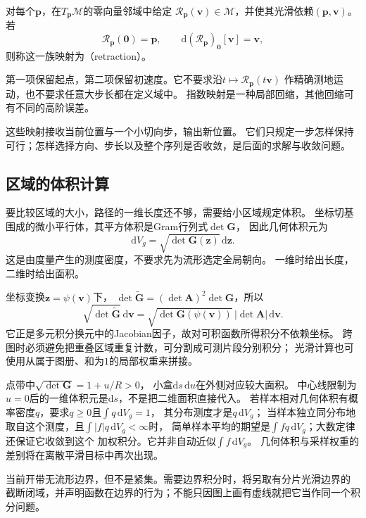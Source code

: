 \begin{definition}[回缩]
\label{def:geometry-retraction}
对每个$\bm p$，在$T_{\bm p}\mathcal M$的零向量邻域中给定
$\mathcal R_{\bm p}(\bm v)\in\mathcal M$，并使其光滑依赖$(\bm p,\bm v)$。
若
\[
 \mathcal R_{\bm p}(\bm0)=\bm p,\qquad
 \mathrm d(\mathcal R_{\bm p})_{\bm0}[\bm v]=\bm v,
\]
则称这一族映射为（retraction）。
\end{definition}
第一项保留起点，第二项保留初速度。它不要求沿$t\mapsto\mathcal R_{\bm p}(t\bm v)$
作精确测地运动，也不要求任意大步长都在定义域中。
指数映射是一种局部回缩，其他回缩可有不同的高阶误差。


这些映射接收当前位置与一个小切向步，输出新位置。
它们只规定一步怎样保持可行；怎样选择方向、步长以及整个序列是否收敛，是后面的求解与收敛问题。

\subsection{区域的体积计算}
\label{sec:geometry-riemannian-volume}

要比较区域的大小，路径的一维长度还不够，需要给小区域规定体积。
坐标切基围成的微小平行体，其平方体积是Gram行列式$\det\bm G$，
因此几何体积元为
\begin{equation}
 \mathrm dV_g=\sqrt{\det\bm G(\bm z)}\,\mathrm d\bm z.
 \label{eq:geometry-riemannian-volume}
\end{equation}
这是由度量产生的测度密度，不要求先为流形选定全局朝向。
一维时给出长度，二维时给出面积。

坐标变换$\bm z=\psi(\bm v)$下，
$\det\widetilde{\bm G}=(\det\bm A)^2\det\bm G$，所以
\[
 \sqrt{\det\widetilde{\bm G}}\,\mathrm d\bm v
 =\sqrt{\det\bm G(\psi(\bm v))}\,|\det\bm A|\,\mathrm d\bm v.
\]
它正是多元积分换元中的Jacobian因子，故对可积函数所得积分不依赖坐标。
跨图时必须避免把重叠区域重复计数，可分割成可测片段分别积分；
光滑计算也可使用从属于图册、和为$1$的局部权重来拼接。

点带中$\sqrt{\det\bm G}=1+u/R>0$，
小盒$\mathrm ds\,\mathrm du$在外侧对应较大面积。
中心线限制为$u=0$后的一维体积元是$\mathrm ds$，不是把二维面积直接代入。
若样本相对几何体积有概率密度$q$，要求$q\geq0$且$\int q\,\mathrm dV_g=1$，
其分布测度才是$q\,\mathrm dV_g$；
当样本独立同分布地取自这个测度，且$\int|f|q\,\mathrm dV_g<\infty$时，
简单样本平均的期望是$\int fq\,\mathrm dV_g$；大数定律还保证它收敛到这个
加权积分。它并非自动近似$\int f\,\mathrm dV_g$。
几何体积与采样权重的差别将在离散平滑目标中再次出现。

当前开带无流形边界，但不是紧集。需要边界积分时，将另取有分片光滑边界的
截断闭域，并声明函数在边界的行为；不能只因图上画有虚线就把它当作同一个积分问题。

